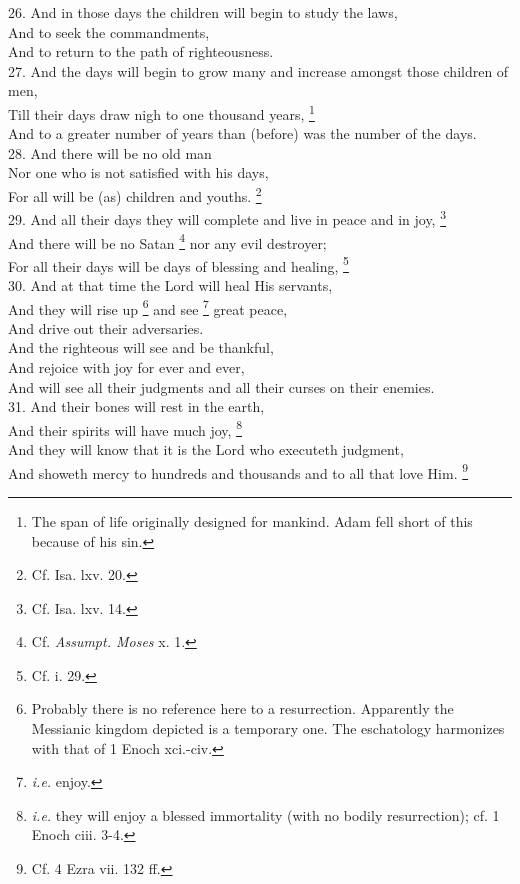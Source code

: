 26. And in those days the children will begin to study the laws,\\
And to seek the commandments,\\
And to return to the path of righteousness.\\
27. And the days will begin to grow many and increase amongst those children of men, \\
Till their days draw nigh to one thousand years, \footnote{The span of life originally designed for mankind. Adam fell short of this because of his sin.}\\
And to a greater number of years than (before) was the number of the days.\\
28. And there will be no old man\\
Nor one who is not satisfied with his days,\\
For all will be (as) children and youths. \footnote{Cf. Isa. lxv. 20.}\\
29. And all their days they will complete and live in peace and in joy, \footnote{Cf. Isa. lxv. 14.}\\
And there will be no Satan \footnote{Cf. \emph{Assumpt. Moses} x. 1.} nor any evil destroyer;\\
For all their days will be days of blessing and healing, \footnote{Cf. i. 29.}\\
30. And at that time the Lord will heal His servants,\\
And they will rise up \footnote{Probably there is no reference here to a resurrection. Apparently the Messianic kingdom depicted is a temporary one. The eschatology harmonizes with that of 1 Enoch xci.-civ.} and see \footnote{\emph{i.e.} enjoy.} great peace,\\
And drive out their adversaries.\\
And the righteous will see and be thankful,\\
And rejoice with joy for ever and ever,\\
And will see all their judgments and all their curses on their enemies.\\
31. And their bones will rest in the earth,\\
And their spirits will have much joy, \footnote{\emph{i.e.} they will enjoy a blessed immortality (with no bodily resurrection); cf. 1 Enoch ciii. 3-4.}\\
And they will know that it is the Lord who executeth judgment,\\
And showeth mercy to hundreds and thousands and to all that love Him. \footnote{Cf. 4 Ezra vii. 132 ff.}


